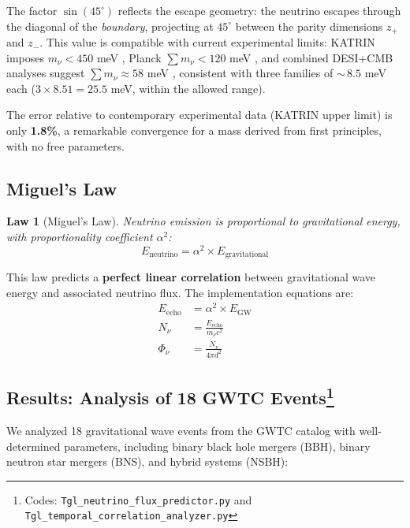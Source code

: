 \documentclass[12pt,a4paper,twoside]{article}
\newtheorem{law}{Law}
\newcommand{\alphaii}{\alpha^{2}}
\newcommand{\boundary}{\textit{boundary}}
\begin{document}
\noindent The factor $\sin(45^\circ)$ reflects the escape geometry: the neutrino escapes through the diagonal of the \boundary, projecting at $45^\circ$ between the parity dimensions $z_+$ and $z_-$. This value is compatible with current experimental limits: KATRIN imposes $m_\nu < 450$ meV \cite{KATRIN2024}, Planck $\sum m_\nu < 120$ meV \cite{Planck2018}, and combined DESI+CMB analyses suggest $\sum m_\nu \approx 58$ meV \cite{DESI2024}, consistent with three families of ${\sim}\,8.5$ meV each ($3 \times 8.51 = 25.5$ meV, within the allowed range).



The error relative to contemporary experimental data (KATRIN upper limit) is only \textbf{1.8\%}, a remarkable convergence for a mass derived from first principles, with no free parameters.

\subsection{Miguel's Law}

\begin{law}[Miguel's Law]
Neutrino emission is proportional to gravitational energy, with proportionality coefficient $\alphaii$:
\begin{equation}
\boxed{E_{\text{neutrino}} = \alphaii \times E_{\text{gravitational}}}
\label{eq:miguel_law}
\end{equation}
\end{law}

\noindent This law predicts a \textbf{perfect linear correlation} between gravitational wave energy and associated neutrino flux. The implementation equations are:
\begin{align}
E_{\text{echo}} &= \alphaii \times E_{\text{GW}} \label{eq:e_echo}\\[4pt]
N_\nu &= \frac{E_{\text{echo}}}{m_\nu c^2} \label{eq:n_nu}\\[4pt]
\Phi_\nu &= \frac{N_\nu}{4\pi d^2} \label{eq:phi_nu}
\end{align}



\subsection[Results: Analysis of 18 GWTC Events]{Results: Analysis of 18 GWTC Events\footnote{Codes: \texttt{Tgl\_neutrino\_flux\_predictor.py} and \texttt{Tgl\_temporal\_correlation\_analyzer.py}}}

We analyzed 18 gravitational wave events from the GWTC catalog with well-determined parameters, including binary black hole mergers (BBH), binary neutron star mergers (BNS), and hybrid systems (NSBH):
\end{document}
